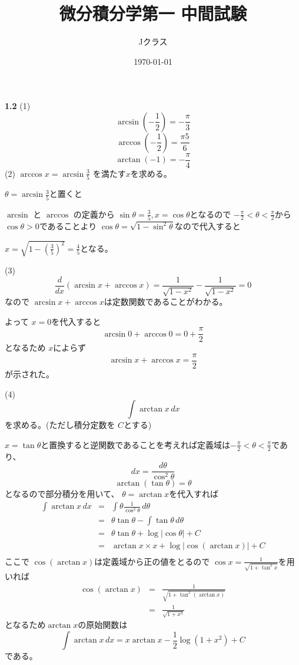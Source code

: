 \documentclass[dvipdfmx,twocolumn]{jsarticle}
\title{微分積分学第一 中間試験}
\author{Jクラス}
\date{\today}
\begin{document}
\maketitle
\textbf{1.2}
(1)
\[\arcsin (- \frac{1}{2}) = - \frac{\pi}{3}\]
\[\arccos (- \frac{1}{2}) = \frac{\pi 5}{6}\]
\[\arctan (-1) = - \frac{\pi}{4}\]
(2)
$\arccos x = \arcsin \frac{3}{5}$ を満たす$x$を求める。

$\theta = \arcsin \frac{3}{5}$と置くと

$\arcsin$ と $\arccos$ の定義から
$\sin \theta = \frac{3}{5} , x = \cos \theta$となるので
$- \frac{\pi}{2} < \theta < \frac{\pi}{2}$から $\cos \theta  > 0$であることより
$\cos \theta = \sqrt{1 - \sin^2 \theta}$なので代入すると

$x = \sqrt{1 - (\frac{3}{5})^2} = \frac{4}{5}$となる。

(3)
\[
\frac{d}{dx} (\arcsin x + \arccos x) = \frac{1}{\sqrt{1 - x^2}} - \frac{1}{\sqrt{1 - x^2}} = 0
\]
なので $\arcsin x + \arccos x$は定数関数であることがわかる。

よって $x = 0$を代入すると
\[\arcsin 0 + \arccos 0 = 0 + \frac{\pi}{2}\]
となるため
$x$によらず
\[\arcsin x + \arccos x = \frac{\pi}{2}\]
が示された。

(4)
\[
\int \arctan x \, dx
\]
を求める。(ただし積分定数を $C$とする)

$x = \tan \theta$と置換すると逆関数であることを考えれば定義域は$- \frac{\pi}{2} < \theta < \frac{\pi}{2}$であり、
\[dx = \frac{d \theta}{\cos^2 \theta}\]
\[\arctan (\tan \theta) = \theta\]
となるので部分積分を用いて、 $\theta = \arctan x$を代入すれば
\begin{eqnarray*}
  \int \arctan x \, dx & = & \int \theta \frac{1}{\cos^2 \theta} \, d \theta \\
  & = & \theta \tan \theta - \int \tan \theta \,d \theta \\
  & = & \theta \tan \theta + \log |\cos \theta| + C \\
  & = & \arctan x \times x + \log |\cos (\arctan x)| + C \\
\end{eqnarray*}
ここで $\cos (\arctan x)$は定義域から正の値をとるので $\cos x = \frac{1}{\sqrt{1 + \tan^2 x}}$を用いれば
\begin{eqnarray*}
  \cos (\arctan x) & = & \frac{1}{\sqrt{1 + \tan^2 (\arctan x)}} \\
  & = & \frac{1}{\sqrt{1 + x^2}}
\end{eqnarray*}
となるため$\arctan x$の原始関数は
\[
\int \arctan x \, dx = x\arctan x - \frac{1}{2} \log (1 + x^2) + C
\]
である。 \\
\end{document}
